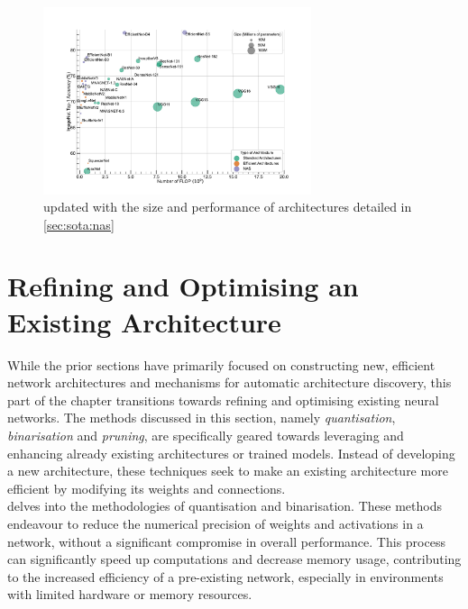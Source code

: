 \begin{figure}[htbp]
    \centering
    \includegraphics[width=0.70\textwidth]{chapter_sota/assets/network_sizes_normal_eff_nas.pdf}
    \caption{ updated with the size and
    performance of architectures detailed in \cref{sec:sota:nas}}
    \label{fig:sota:net_sizes_std_eff_nas}
\end{figure}


\section{Refining and Optimising an Existing Architecture}\label{sec:sota:refining_existing} 

While the prior sections have primarily focused on constructing new, efficient
network architectures and mechanisms for automatic architecture discovery, this
part of the chapter transitions towards refining and optimising existing neural
networks. The methods discussed in this section, namely \emph{quantisation},
\emph{binarisation} and \emph{pruning}, are specifically geared towards
leveraging and enhancing already existing architectures or trained models.
Instead of developing a new architecture, these techniques seek to make an
existing architecture more efficient by modifying its weights and connections.\\

 delves into the methodologies of
quantisation and binarisation. These methods endeavour to reduce the numerical
precision of weights and activations in a network, without a significant
compromise in overall performance. This process can significantly speed up
computations and decrease memory usage, contributing to the increased efficiency
of a pre-existing network, especially in environments with limited hardware or
memory resources.\\

